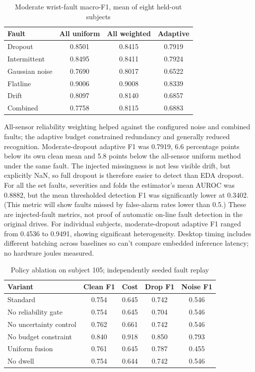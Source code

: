 \documentclass[conference]{IEEEtran}
\begin{document}
\begin{table}[t]
\caption{Moderate wrist-fault macro-F1, mean of eight held-out subjects}
\centering\footnotesize
\begin{tabular}{lccc}
\toprule Fault & All uniform & All weighted & Adaptive \\
\midrule
Dropout & 0.8501 & 0.8415 & 0.7919 \\
Intermittent & 0.8495 & 0.8411 & 0.7924 \\
Gaussian noise & 0.7690 & 0.8017 & 0.6522 \\
Flatline & 0.9006 & 0.9008 & 0.8339 \\
Drift & 0.8097 & 0.8140 & 0.6857 \\
Combined & 0.7758 & 0.8115 & 0.6883 \\
\bottomrule
\end{tabular}
\label{tab:fault}
\end{table}

All-sensor reliability weighting helped against the configured noise and combined faults; the adaptive budget constrained redundancy and generally reduced recognition. Moderate-dropout adaptive F1 was 0.7919, 6.6 percentage points below its own clean mean and 5.8 points below the all-sensor uniform method under the same fault. The injected missingness is not less visible drift, but explicitly NaN, so full dropout is therefore easier to detect than EDA dropout. For all the set faults, severities and folds the estimator's mean AUROC was 0.8882, but the mean thresholded detection F1 was significantly lower at 0.3402. (This metric will show faults missed by false-alarm rates lower than 0.5.) These are injected-fault metrics, not proof of automatic on-line fault detection in the original drives. For individual subjects, moderate-dropout adaptive F1 ranged from 0.4536 to 0.9491, showing significant heterogeneity. Desktop timing includes different batching across baselines so can't compare embedded inference latency; no hardware joules measured.

\begin{table}[t]
\caption{Policy ablation on subject 105; independently seeded fault replay}
\centering\scriptsize
\begin{tabular}{lcccc}
\toprule Variant & Clean F1 & Cost & Drop F1 & Noise F1 \\
\midrule
Standard & 0.754 & 0.645 & 0.742 & 0.546 \\
No reliability gate & 0.754 & 0.645 & 0.704 & 0.546 \\
No uncertainty control & 0.762 & 0.661 & 0.742 & 0.546 \\
No budget constraint & 0.840 & 0.918 & 0.850 & 0.793 \\
Uniform fusion & 0.761 & 0.645 & 0.787 & 0.455 \\
No dwell & 0.754 & 0.644 & 0.742 & 0.546 \\
\bottomrule
\end{tabular}
\label{tab:ablation}
\end{table}
\end{document}
